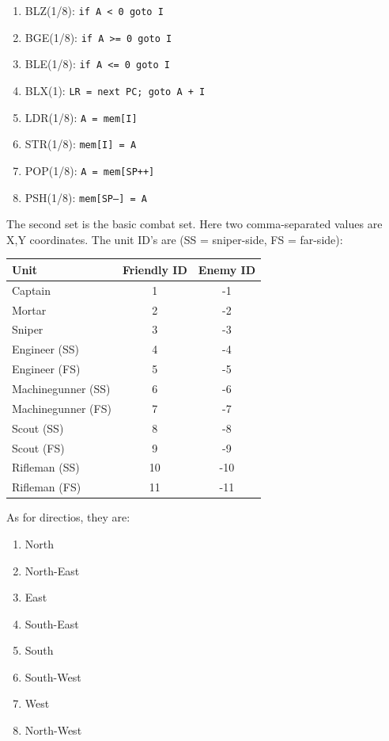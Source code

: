 \documentclass{article}
\begin{document}
\begin{enumerate}[noitemsep]
    \item BLZ(1/8): \texttt{if A < 0 goto I}
    \item BGE(1/8): \texttt{if A >= 0 goto I}
    \item BLE(1/8): \texttt{if A <= 0 goto I}
    \item BLX(1): \texttt{LR = next PC; goto A + I}
    \item LDR(1/8): \texttt{A = mem[I]}
    \item STR(1/8): \texttt{mem[I] = A}
    \item POP(1/8): \texttt{A = mem[SP++]}
    \item PSH(1/8): \texttt{mem[SP--] = A}
\end{enumerate}

The second set is the basic combat set. Here two comma-separated values are X,Y
coordinates. The unit ID's are (SS = sniper-side, FS = far-side):

\begin{tabular}{l|c|c}
    Unit & Friendly ID & Enemy ID \\ \hline
    Captain & 1 & -1 \\ \hline
    Mortar & 2 & -2 \\ \hline
    Sniper & 3 & -3 \\ \hline
    Engineer (SS) & 4 & -4 \\ \hline
    Engineer (FS) & 5 & -5 \\ \hline
    Machinegunner (SS) & 6 & -6 \\ \hline
    Machinegunner (FS) & 7 & -7 \\ \hline
    Scout (SS) & 8 & -8 \\ \hline
    Scout (FS) & 9 & -9 \\ \hline
    Rifleman (SS) & 10 & -10 \\ \hline
    Rifleman (FS) & 11 & -11 \\ \hline
\end{tabular}

As for directios, they are:

\begin{enumerate}[noitemsep]
    \item North
    \item North-East
    \item East
    \item South-East
    \item South
    \item South-West
    \item West
    \item North-West
\end{enumerate}
\end{document}
